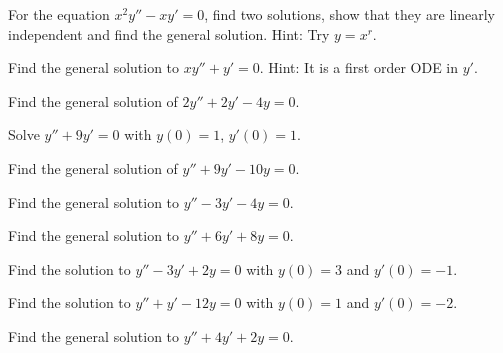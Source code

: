 \documentclass{ximera}
\begin{document}
\begin{exercise}
    For the equation $x^2 y'' - x y' = 0$, find two solutions, show that they are linearly independent and find the general solution.
Hint: Try $y = x^r$.
\end{exercise}

\begin{exercise}%
    Find the general solution to $x y'' + y' = 0$.  Hint: It is a first order ODE in $y'$.
\end{exercise}

\begin{exercise}
    Find the general solution of $2y'' + 2y' -4 y = 0$.
\end{exercise}

\begin{exercise}
    Solve $y'' + 9y' = 0$ with $y(0) = 1$, $y'(0) = 1$.
\end{exercise}
\begin{exercise}
    Find the general solution of $y'' + 9y' - 10 y = 0$.
\end{exercise}

\begin{exercise}
    Find the general solution to $y'' - 3y' - 4y = 0$.
\end{exercise}

\begin{exercise}
    Find the general solution to $y'' + 6y' + 8y = 0$.
\end{exercise}

\begin{exercise}
    Find the solution to $y'' - 3y' + 2y = 0$ with $y(0) = 3$ and $y'(0) = -1$.
\end{exercise}

\begin{exercise}
    Find the solution to $y'' + y' -12y = 0$ with $y(0) = 1$ and $y'(0) = -2$.
\end{exercise}
\begin{exercise}%
    Find the general solution to $y''+4y'+2y=0$.
\end{exercise}
\end{document}
